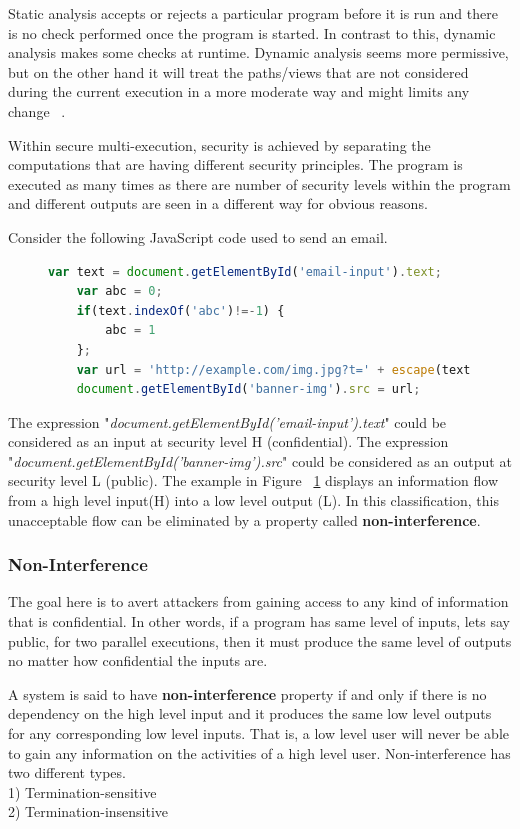Static analysis accepts or rejects a particular program before it is run and there is no check performed once the program is started. In contrast to this, dynamic analysis makes some checks at runtime. Dynamic analysis seems more permissive, but on the other hand it will treat the paths/views that are not considered during the current execution in a more moderate way and might limits any change ~\cite{secureMulti}. 

Within secure multi-execution, security is achieved by separating the computations that are having different security principles. The program is executed as many times as there are number of security levels within the program and different outputs are seen in a different way for obvious reasons.

Consider the following JavaScript code used to send an email.

\begin{figure}[h]
  \centering
\begin{lstlisting}[language=JavaScript] 
	var text = document.getElementById('email-input').text;
	var abc = 0;
	if(text.indexOf('abc')!=-1) { 
		abc = 1 
	};
	var url = 'http://example.com/img.jpg?t=' + escape(text) + abc;
	document.getElementById('banner-img').src = url;
\end{lstlisting}
\caption[Information Flow]
    {}
    \label{fig:SME1}
\end{figure}

The expression "{\it document.getElementById('email-input').text}" could be considered as an input at security level H (confidential). The expression "{\it document.getElementById('banner-img').src}" could be considered as an output at security level L (public). The example in Figure ~\ref{fig:SME1} displays an information flow from a high level input(H) into a low level output (L). In this classification, this unacceptable flow can be eliminated by a property called \textbf{non-interference}. 

\subsubsection{Non-Interference}
The goal here is to avert attackers from gaining access to any kind of information that is confidential. In other words, if a program has same level of inputs, lets say public, for two parallel executions, then it must produce the same level of outputs no matter how confidential the inputs are.

A system is said to have \textbf{non-interference} property if and only if there is no dependency on the high level input and it produces the same low level outputs for any corresponding low level inputs. That is, a low level user will never be able to gain any information on the activities of a high level user. Non-interference has two different types. \\
1) Termination-sensitive\\
2) Termination-insensitive

